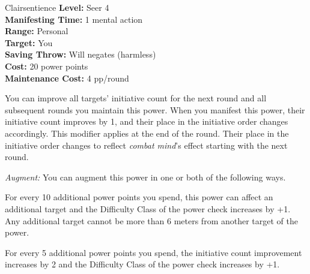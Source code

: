{Clairsentience}
{
	\textbf{Level:}
	Seer 4\\
	\textbf{Manifesting Time:}
	1 mental action\\
	\textbf{Range:}
	Personal\\
	\textbf{Target:}
	You\\
	\textbf{Saving Throw:}
	Will negates (harmless)\\
	\textbf{Cost:}
	20 power points\\
	\textbf{Maintenance Cost:}
	4 pp/round\\
}
{
	You can improve all targets' initiative count for the next round and all subsequent rounds you maintain this power. When you manifest this power, their initiative count improves by 1, and their place in the initiative order changes accordingly. This modifier applies at the end of the round. Their place in the initiative order changes to reflect \emph{combat mind}'s effect starting with the next round.

	\textit{Augment:} You can augment this power in one or both of the following ways.
	\begin{enumerate*}
		\item For every 10 additional power points you spend, this power can affect an additional target and the Difficulty Class of the power check increases by +1. Any additional target cannot be more than 6 meters from another target of the power.
		\item For every 5 additional power points you spend, the initiative count improvement increases by 2 and the Difficulty Class of the power check increases by +1.
	\end{enumerate*}
}